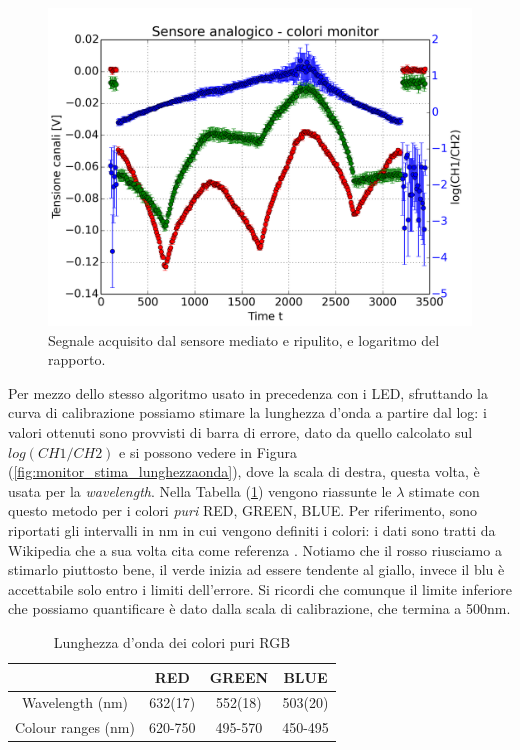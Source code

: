 \documentclass[10pt,letterpaper]{article}
\begin{document}
\begin{figure}
\centering
\includegraphics[width=0.7\linewidth]{./analog_segnale_log_average}
\caption{Segnale acquisito dal sensore mediato e ripulito, e logaritmo del rapporto.}
\label{fig:analog_segnale_log_average}
\end{figure}

Per mezzo dello stesso algoritmo usato in precedenza con i LED, sfruttando la curva di calibrazione possiamo stimare la lunghezza d'onda a partire dal log: i valori ottenuti sono provvisti di barra di errore, dato da quello calcolato sul $log(CH1/CH2)$ e si possono vedere in Figura (\ref{fig:monitor_stima_lunghezzaonda}), dove la scala di destra, questa volta, è usata per la \textit{wavelength}. Nella Tabella (\ref{RGB_lambda}) vengono riassunte le $\lambda$ stimate con questo metodo per i colori \textit{puri} RED, GREEN, BLUE. Per riferimento, sono riportati gli intervalli in nm in cui vengono definiti i colori: i dati sono tratti da Wikipedia che a sua volta cita come referenza \cite[Thomas J. Bruno, Paris D. N. Svoronos. CRC Handbook of Fundamental Spectroscopic Correlation Charts]{bib3}. Notiamo che il rosso riusciamo a stimarlo piuttosto bene, il verde inizia ad essere tendente al giallo, invece il blu è accettabile solo entro i limiti dell'errore. Si ricordi che comunque il limite inferiore che possiamo quantificare è dato dalla scala di calibrazione, che termina a 500nm.\\

\begin{table}[h]
\centering
\begin{tabular}{c|c|c|c}
  & \textbf{RED} & \textbf{GREEN} & \textbf{BLUE} \\ 
 \hline Wavelength (nm) & 632(17) & 552(18) & 503(20) \\
 Colour ranges (nm) & 620-750 & 495-570 & 450-495 \\ 
\hline 
\end{tabular} 
\caption{Lunghezza d'onda dei colori puri RGB}
\label{RGB_lambda}
\end{table}
\end{document}
